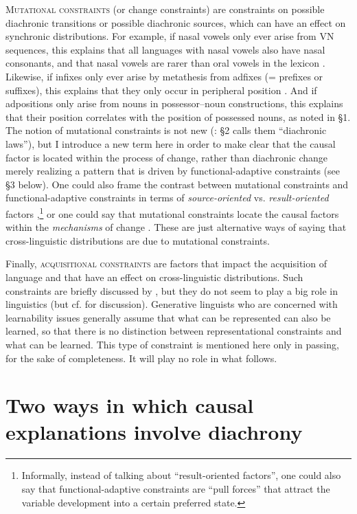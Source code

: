 \documentclass[output=paper]{langsci/langscibook}
\begin{document}
\textsc{Mutational constraints} (or change constraints) are constraints on possible diachronic transitions or possible diachronic sources, which can have an effect on synchronic distributions. For example, if nasal vowels only ever arise from VN sequences, this explains that all languages with nasal vowels also have nasal consonants, and that nasal vowels are rarer than oral vowels in the lexicon \citep{Greenberg1978}. Likewise, if infixes only ever arise by metathesis from adfixes (= prefixes or suffixes), this explains that they only occur in peripheral position \citep[51]{Plank2007}. And if adpositions only arise from nouns in possessor–noun constructions, this explains that their position correlates with the position of possessed nouns, as noted in §1. The notion of mutational constraints is not new (\citealt{Plank2007}: §2 calls them “diachronic laws”), but I introduce a new term here in order to make clear that the causal factor is located within the process of change, rather than diachronic change merely realizing a pattern that is driven by functional-adaptive constraints (see §3 below). One could also frame the contrast between mutational constraints and functional-adaptive constraints in terms of \textit{source-oriented} vs. \textit{result-oriented} factors \citep{Cristofaro2017},\footnote{Informally, instead of talking about “result-oriented factors”, one could also say that functional-adaptive constraints are “pull forces” that attract the variable development into a certain preferred state.} or one could say that mutational constraints locate the causal factors within the \textit{mechanisms} of change \citep{Bybee2006}. These are just alternative ways of saying that cross-linguistic distributions are due to mutational constraints.

Finally, \textsc{acquisitional constraints} are factors that impact the acquisition of language and that have an effect on cross-linguistic distributions. Such constraints are briefly discussed by \citet{Anderson2016}, but they do not seem to play a big role in linguistics (but cf.  for discussion). Generative linguists who are concerned with learnability issues generally assume that what can be represented can also be learned, so that there is no distinction between representational constraints and what can be learned. This type of constraint is mentioned here only in passing, for the sake of completeness. It will play no role in what follows.

\section{Two ways in which causal explanations involve diachrony}\label{sec:haspelmath:3}
\end{document}
